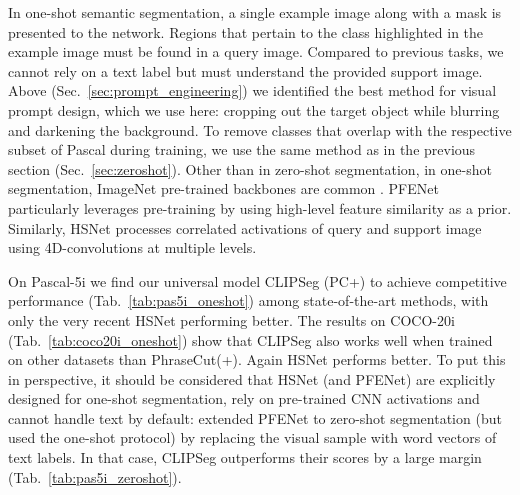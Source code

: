 \documentclass[10pt,twocolumn,letterpaper]{article}
\begin{document}
In one-shot semantic segmentation, a single example image along with a mask is presented to the network. Regions that pertain to the class highlighted in the example image must be found in a query image. Compared to previous tasks, we cannot rely on a text label but must understand the provided support image.
Above (Sec.~\ref{sec:prompt_engineering}) we identified the best method for visual prompt design, which we use here: cropping out the target object while blurring and darkening the background. 
To remove classes that overlap with the respective subset of Pascal during training, we use the same method as in the previous section (Sec.~\ref{sec:zeroshot}).
Other than in zero-shot segmentation, in one-shot segmentation, ImageNet pre-trained backbones are common \cite{tian20a, wang19a}. PFENet particularly leverages pre-training by using high-level feature similarity as a prior. Similarly, HSNet \cite{min21hsnet} processes correlated activations of query and support image using 4D-convolutions at multiple levels.

On Pascal-5i we find our universal model CLIPSeg (PC+) to achieve competitive performance (Tab.~\ref{tab:pas5i_oneshot}) among state-of-the-art methods, with only the very recent HSNet performing better.
The results on COCO-20i (Tab.~\ref{tab:coco20i_oneshot}) show that CLIPSeg also works well when trained on other datasets than PhraseCut(+). Again HSNet performs better. To put this in perspective, it should be considered that HSNet (and PFENet) are explicitly designed for one-shot segmentation, rely on pre-trained CNN activations and cannot handle text by default:
\citet{tian20a} extended PFENet to zero-shot segmentation (but used the one-shot protocol) by replacing the visual sample with word vectors \cite{word2vec, mikolov18} of text labels. In that case, CLIPSeg outperforms their scores by a large margin (Tab.~\ref{tab:pas5i_zeroshot}).
\end{document}

